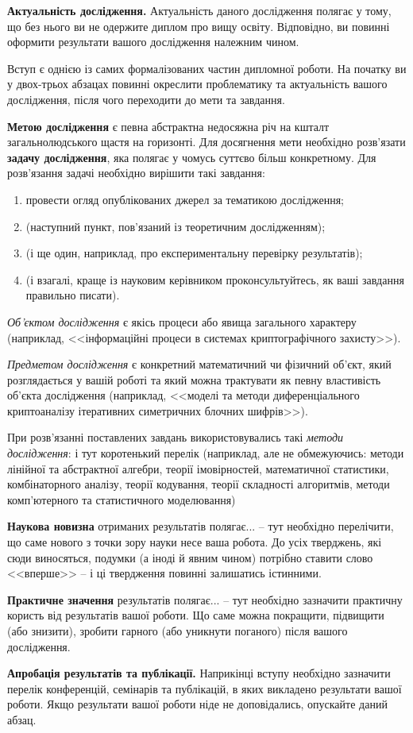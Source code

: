 \textbf{Актуальність дослідження.} Актуальність даного дослідження полягає
у тому, що без нього ви не одержите диплом про вищу освіту. Відповідно, ви повинні
оформити результати вашого дослідження належним чином.

Вступ є однією із самих формалізованих частин дипломної роботи. На початку
ви у двох-трьох абзацах повинні окреслити проблематику та актуальність
вашого дослідження, після чого переходити до мети та завдання.

\textbf{Метою дослідження} є певна абстрактна недосяжна річ на кшталт
загальнолюдського щастя на горизонті. Для досягнення мети необхідно
розв'язати \textbf{задачу дослідження}, яка полягає у чомусь суттєво більш
конкретному. Для розв'язання задачі необхідно вирішити такі завдання:

\begin{enumerate}
\item провести огляд опублікованих джерел за тематикою дослідження;
\item (наступний пункт, пов'язаний із теоретичним дослідженням);
\item (і ще один, наприклад, про експериментальну перевірку результатів);
\item (і взагалі, краще із науковим керівником проконсультуйтесь, як ваші
завдання правильно писати).
\end{enumerate}

\emph{Об'єктом дослідження} є якісь процеси або явища загального
характеру (наприклад, <<інформаційні процеси в системах криптографічного
захисту>>).

\emph{Предметом дослідження} є конкретний математичний чи фізичний
об'єкт, який розглядається у вашій роботі та який можна трактувати
як певну властивість об'єкта дослідження (наприклад, <<моделі та методи
диференціального криптоаналізу ітеративних симетричних блочних шифрів>>).

При розв’язанні поставлених завдань використовувались такі \emph{методи дослідження}: і
тут коротенький перелік (наприклад, але не обмежуючись: методи лінійної та абстрактної
алгебри, теорії імовірностей, математичної статистики, комбінаторного
аналізу, теорії кодування, теорії складності алгоритмів, методи
комп’ютерного та статистичного моделювання)

\textbf{Наукова новизна} отриманих результатів полягає... -- тут необхідно
перелічити, що саме нового з точки зору науки несе ваша робота. До усіх
тверджень, які сюди виносяться, подумки (а іноді й явним чином) потрібно
ставити слово <<вперше>> -- і ці твердження повинні залишатись істинними.

\textbf{Практичне значення} результатів полягає... -- тут необхідно
зазначити практичну користь від результатів вашої роботи. Що саме можна
покращити, підвищити (або знизити), зробити гарного (або уникнути
поганого) після вашого дослідження.

\textbf{Апробація результатів та публікації.} Наприкінці вступу необхідно
зазначити перелік конференцій, семінарів та публікацій, в яких викладено
результати вашої роботи. Якщо результати вашої роботи ніде не
доповідались, опускайте даний абзац.
